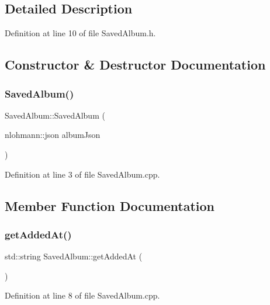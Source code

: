 \subsection{Detailed Description}


Definition at line 10 of file Saved\+Album.\+h.



\subsection{Constructor \& Destructor Documentation}
\mbox{\label{class_saved_album_a4bd0345472be84b862018e266f56ed7c}} 
\subsubsection{\texorpdfstring{Saved\+Album()}{SavedAlbum()}}
{\footnotesize\ttfamily Saved\+Album\+::\+Saved\+Album (\begin{DoxyParamCaption}\item[{nlohmann\+::json}]{album\+Json }\end{DoxyParamCaption})}



Definition at line 3 of file Saved\+Album.\+cpp.



\subsection{Member Function Documentation}
\mbox{\label{class_saved_album_aa8fc786f49a4a40aa970b0abb15564ba}} 
\subsubsection{\texorpdfstring{get\+Added\+At()}{getAddedAt()}}
{\footnotesize\ttfamily std\+::string Saved\+Album\+::get\+Added\+At (\begin{DoxyParamCaption}{ }\end{DoxyParamCaption})}



Definition at line 8 of file Saved\+Album.\+cpp.

